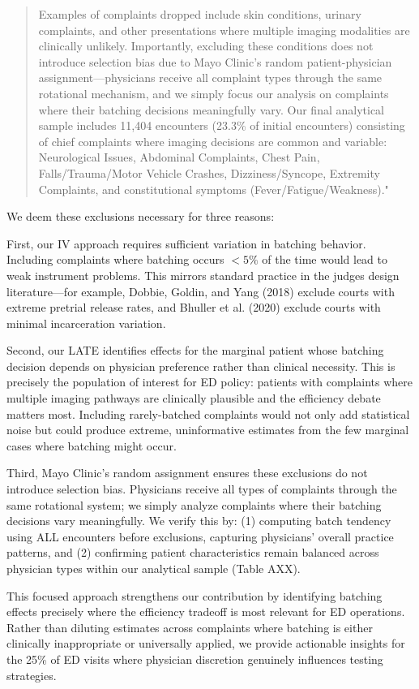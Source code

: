 \documentclass[11pt]{article}
\newcommand{\1}{\hbox{\rm 1\kern-.35em 1}}
\begin{document}
{{\begin{quote}
Examples of complaints dropped include skin conditions, urinary complaints, and other presentations where multiple imaging modalities are clinically unlikely. Importantly, excluding these conditions does not introduce selection bias due to Mayo Clinic's random patient-physician assignment—physicians receive all complaint types through the same rotational mechanism, and we simply focus our analysis on complaints where their batching decisions meaningfully vary. Our final analytical sample includes 11,404 encounters (23.3\% of initial encounters) consisting of chief complaints where imaging decisions are common and variable: Neurological Issues, Abdominal Complaints, Chest Pain, Falls/Trauma/Motor Vehicle Crashes, Dizziness/Syncope, Extremity Complaints, and constitutional symptoms (Fever/Fatigue/Weakness)."
\end{quote}

We deem these exclusions necessary for three reasons:

First, our IV approach requires sufficient variation in batching behavior. Including complaints where batching occurs $<5\%$ of the time would lead to weak instrument problems. This mirrors standard practice in the judges design literature---for example, Dobbie, Goldin, and Yang (2018) exclude courts with extreme pretrial release rates, and Bhuller et al. (2020) exclude courts with minimal incarceration variation.

Second, our LATE identifies effects for the marginal patient whose batching decision depends on physician preference rather than clinical necessity. This is precisely the population of interest for ED policy: patients with complaints where multiple imaging pathways are clinically plausible and the efficiency debate matters most. Including rarely-batched complaints would not only add statistical noise but could produce extreme, uninformative estimates from the few marginal cases where batching might occur. 

Third, Mayo Clinic's random assignment ensures these exclusions do not introduce selection bias. Physicians receive all types of complaints through the same rotational system; we simply analyze complaints where their batching decisions vary meaningfully. We verify this by: (1) computing batch tendency using ALL encounters before exclusions, capturing physicians' overall practice patterns, and (2) confirming patient characteristics remain balanced across physician types within our analytical sample (Table AXX).

This focused approach strengthens our contribution by identifying batching effects precisely where the efficiency tradeoff is most relevant for ED operations. Rather than diluting estimates across complaints where batching is either clinically inappropriate or universally applied, we provide actionable insights for the 25\% of ED visits where physician discretion genuinely influences testing strategies.

}}
\end{document}
